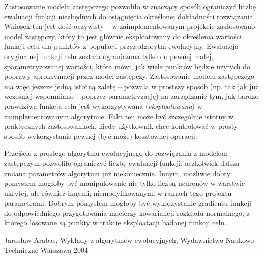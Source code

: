 \documentclass[runningheads]{llncs}
\begin{document}
Zastosowanie modelu zastępczego pozwoliło w znaczący sposób ograniczyć liczbę 
ewaluacji funkcji niezbędnych do osiągnięcia określonej dokładności 
rozwiązania. Wniosek ten jest dość oczywisty -- w zaimplementowanym projekcie 
zastosowano model zastępczy, który to jest głównie eksploatowany do określenia 
wartości funkcji celu dla punktów z populacji przez algorytm ewolucyjny. 
Ewaluacja oryginalnej funkcji celu została ograniczona tylko do pewnej małej, 
sparametryzowanej wartości, która mówi, jak wiele punktów będzie użytych do 
poprawy aproksymacji przez model zastępczy. 
Zastosowanie modelu zastępczego ma więc jeszcze jedną istotną zaletę -- pozwala 
w prostszy sposób (np. tak jak już wcześniej wspomniano -- poprzez 
parametryzację) na zarządzanie tym, jak bardzo prawdziwa funkcja celu jest 
wykorzystywana (\emph{eksploatowana}) w zaimplementowanym algorytmie. Fakt ten 
może być szczególnie istotny w praktycznych zastosowaniach, kiedy użytkownik 
chce kontrolować w prosty sposób wykorzystanie pewnej (być może) kosztownej 
operacji.

Przejście z prostego algorytmu ewolucyjnego do rozwiązania z modelem zastępczym 
pozwoliło ograniczyć liczbę ewaluacji funkcji, aczkolwiek dalsza zmiana 
parametrów algorytmu już niekoniecznie. Innym, możliwie dobry pomysłem mogłoby 
być manipulowanie nie tylko liczbą neuronów w warstwie ukrytej, ale również 
innymi, niemodyfikowanymi w ramach tego projektu parametrami. Dobrym pomysłem 
mogłoby być wykorzystanie gradientu funkcji do odpowiedniego przygotowania 
macierzy kowariancji rozkładu normalnego, z którego losowane są punkty w 
trakcie eksploatacji badanej funkcji celu. 

\begin{thebibliography}{5}
Jarosław Arabas, Wykłady z algorytmów ewolucyjnych,  Wydawnictwo 
Naukowo-Techniczne Warszawa 2004 
\end{thebibliography}
\end{document}
